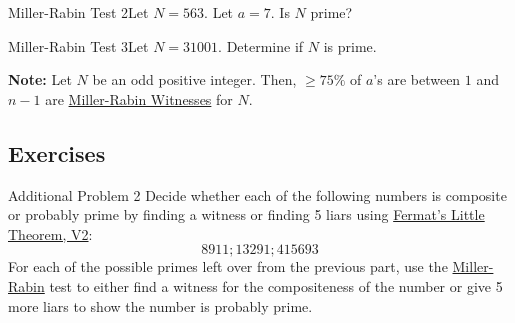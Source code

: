 \begin{example}
    {Miller-Rabin Test 2}Let \(N = 563\). Let \(a = 7\). Is \(N\) prime?
\end{example}


\begin{example}
    {Miller-Rabin Test 3}Let \(N = 31001\). Determine if \(N\) is prime. 
\end{example}


\begin{note}
    \textbf{Note:} Let \(N\) be an odd positive integer. Then, \(\geq 75\%\) of \(a\)'s are between \(1\) and \(n - 1\) are \hyperref[Miller-Rabin Witness]{Miller-Rabin Witnesses} for \(N\).
\end{note}

\renewcommand{\theenumi}{\alph{enumi}}
\renewcommand{\labelenumi}{(\theenumi)}
\subsection{Exercises}

\begin{exercise}
    {Additional Problem 2} Decide whether each of the following numbers is composite or probably prime by finding a witness or finding 5 liars using \hyperref[thm:Fermat's Little Theorem, Version 2]{Fermat's Little Theorem, V2}:
    \[8911; 13291; 415693\]
    For each of the possible primes left over from the previous part, use the \hyperref[sec:Miller-Rabin]{Miller-Rabin} test to either find a witness for the compositeness of the number or give 5 more liars to show the number is probably prime.
\end{exercise}

